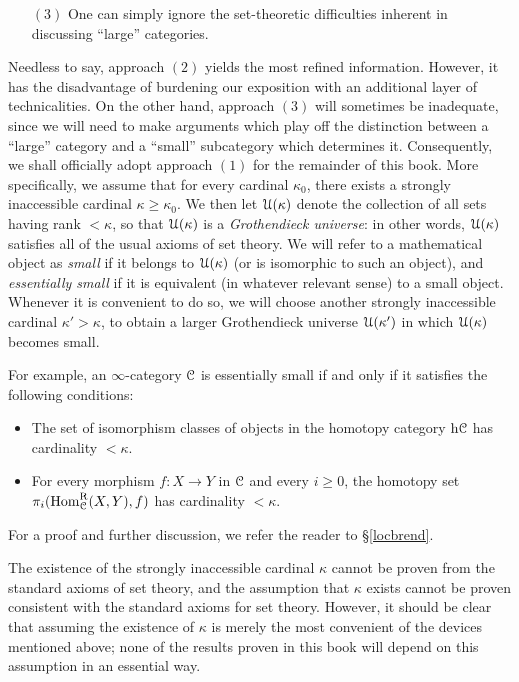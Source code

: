 \begin{1.2.15 Set-Theoretic Technicalities}
\begin{itemize}
 \item[$(3)$] One can simply ignore the set-theoretic difficulties
 inherent in discussing ``large'' categories.

\end{itemize}

Needless to say, approach $(2)$ yields the most refined information. However, it has the disadvantage of burdening our exposition with an additional layer of technicalities. On the other hand, approach $(3)$ will sometimes be inadequate, since we will need to make arguments which play off the distinction between a ``large'' category and a ``small'' subcategory which determines it. Consequently, we shall officially adopt approach $(1)$ for the remainder of this book. More specifically, we assume that for every
cardinal $\kappa_0$, there exists a strongly inaccessible cardinal $\kappa \geq \kappa_0$.
We then let $\operatorname{\mathcal{U}}(\kappa)$ denote the collection of all sets having rank $< \kappa$, so that
$\operatorname{\mathcal{U}}(\kappa)$ is a {\it Grothendieck universe}: in other words, $\operatorname{\mathcal{U}}(\kappa)$ satisfies all of the usual axioms of set theory. We will refer to a mathematical object as {\it small} if it belongs to $\operatorname{\mathcal{U}}(\kappa)$ (or is isomorphic to such an object), and {\it essentially small} if it is equivalent (in whatever relevant sense) to a small object. Whenever it is convenient to do so, we will choose another strongly inaccessible cardinal $\kappa' > \kappa$, to obtain a larger Grothendieck universe
$\operatorname{\mathcal{U}}(\kappa')$ in which $\operatorname{\mathcal{U}}(\kappa)$ becomes small.

For example, an $\infty$-category $\operatorname{\mathcal{C}}$ is essentially small if and only if it satisfies the following conditions:
\begin{itemize}
\item The set of isomorphism classes of objects in the homotopy
category $\rm{h} \it{\operatorname{\mathcal{C}}}$ has cardinality $< \kappa$.

\item For every morphism $f: X \rightarrow Y$ in $\operatorname{\mathcal{C}}$ and every $i \geq 0$, the homotopy
set $\pi_{i}( \operatorname{Hom}^{\operatorname{R}}_{\operatorname{\mathcal{C}}}(X,Y), f)$ has cardinality $< \kappa$.
\end{itemize}

For a proof and further discussion, we refer the reader to \S \ref{locbrend}.

\begin{remark}
The existence of the strongly inaccessible cardinal $\kappa$ cannot be proven from the standard axioms of set theory, and the assumption that $\kappa$ exists cannot be proven consistent with the standard axioms for set theory. However, it should be clear that assuming the existence of $\kappa$ is merely the most convenient of the devices mentioned above; none of the results proven in this book will depend on this assumption in an essential way.
\end{remark}
\end{1.2.15 Set-Theoretic Technicalities}

